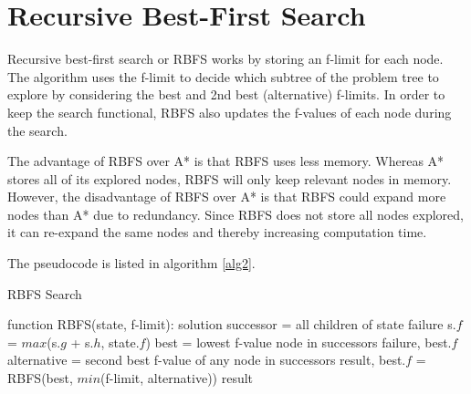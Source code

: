\section{Recursive Best-First Search}

Recursive best-first search or RBFS works by storing an f-limit for each node. The algorithm uses the f-limit to decide which subtree of the problem tree to explore by considering the best and 2nd best (alternative) f-limits. In order to keep the search functional, RBFS also updates the f-values of each node during the search.

The advantage of RBFS over A* is that RBFS uses less memory. Whereas A* stores all of its explored nodes, RBFS will only keep relevant nodes in memory. However, the disadvantage of RBFS over A* is that RBFS could expand more nodes than A* due to redundancy. Since RBFS does not store all nodes explored, it can re-expand the same nodes and thereby increasing computation time.

The pseudocode is listed in algorithm \ref{alg2}.

\begin{algorithm}
\caption{RBFS Search}
\label{alg2}
\begin{algorithmic}
\STATE function RBFS(state, f-limit):
	\RETURN solution
\ENDIF
\STATE successor = all children of state
	\RETURN failure
\ELSE
		\STATE s.$f$ = $max$(s.$g$ + s.$h$, state.$f$)
	\ENDFOR
	\WHILE{\TRUE}
		\STATE best = lowest f-value node in successors
			\RETURN failure, best.$f$
		\ENDIF
		\STATE alternative = second best f-value of any node in successors
		\STATE result, best.$f$ = RBFS(best, $min$(f-limit, alternative))
			\RETURN result
		\ENDIF
	\ENDWHILE
\ENDIF
\end{algorithmic}
\end{algorithm}



